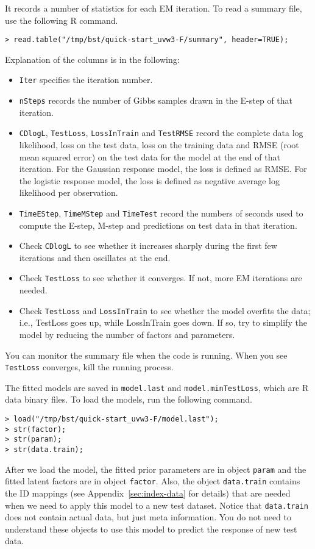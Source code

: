 It records a number of statistics for each EM iteration.  To read a summary file, use the following R command.
{\small\begin{verbatim}
> read.table("/tmp/bst/quick-start_uvw3-F/summary", header=TRUE);
\end{verbatim}}
\noindent Explanation of the columns is in the following:
\begin{itemize}
\item {\tt Iter} specifies the iteration number.
\item {\tt nSteps} records the number of Gibbs samples drawn in the E-step of that iteration.
\item {\tt CDlogL}, {\tt TestLoss}, {\tt LossInTrain} and {\tt TestRMSE} record the complete data log likelihood, loss on the test data, loss on the training data and RMSE (root mean squared error) on the test data for the model at the end of that iteration.  For the Gaussian response model, the loss is defined as RMSE.  For the logistic response model, the loss is defined as negative average log likelihood per observation.
\item {\tt TimeEStep}, {\tt TimeMStep} and {\tt TimeTest} record the numbers of seconds used to compute the E-step, M-step and predictions on test data in that iteration.
\end{itemize}

\begin{itemize}
\item Check {\tt CDlogL} to see whether it increases sharply during the first few iterations and then oscillates at the end.
\item Check {\tt TestLoss} to see whether it converges.  If not, more EM iterations are needed.
\item Check {\tt TestLoss} and {\tt LossInTrain} to see whether the model overfits the data; i.e., TestLoss goes up, while LossInTrain goes down.  If so, try to simplify the model by reducing the number of factors and parameters.
\end{itemize}
You can monitor the summary file when the code is running.  When you see {\tt TestLoss} converges, kill the running process.

The fitted models are saved in {\tt model.last} and {\tt model.minTestLoss}, which are R data binary files.  To load the models, run the following command.
{\small\begin{verbatim}
> load("/tmp/bst/quick-start_uvw3-F/model.last");
> str(factor);
> str(param);
> str(data.train);
\end{verbatim}}
\noindent After we load the model, the fitted prior parameters are in object {\tt param} and the fitted latent factors are in object {\tt factor}.  Also, the object {\tt data.train} contains the ID mappings (see Appendix~\ref{sec:index-data} for details) that are needed when we need to apply this model to a new test dataset.  Notice that {\tt data.train} does not contain actual data, but just meta information.  You do not need to understand these objects to use this model to predict the response of new test data.


